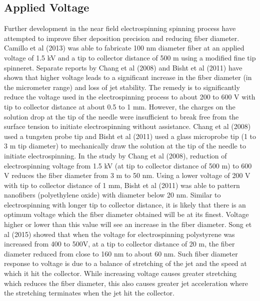 \documentclass[3p,,preprint,12pt]{elsarticle}
\begin{document}
\subsection{Applied Voltage}Further development in the near field electrospinning spinning process have attempted to improve fiber deposition precision and reducing fiber diameter. Camillo et al (2013) was able to fabricate 100 nm diameter fiber at an applied voltage of 1.5 kV and a tip to collector distance of 500 \textmu m using a modified fine tip spinneret. Separate reports by Chang et al (2008) and Bisht et al (2011) have shown that higher voltage leads to a significant increase in the fiber diameter (in the micrometer range) and loss of jet stability. The remedy is to significantly reduce the voltage used in the electrospinning process to about 200 to 600 V with tip to collector distance at about 0.5 to 1 mm. However, the charges on the solution drop at the tip of the needle were insufficient to break free from the surface tension to initiate electrospinning without assistance. Chang et al (2008) used a tungsten probe tip and Bisht et al (2011) used a glass microprobe tip (1 to 3 \textmu m tip diameter) to mechanically draw the solution at the tip of the needle to initiate electrospinning. In the study by Chang et al (2008), reduction of electrospinning voltage from 1.5 kV (at tip to collector distance of 500 \textmu m) to 600 V reduces the fiber diameter from 3 \textmu m to 50 nm. Using a lower voltage of 200 V with tip to collector distance of 1 mm, Bisht et al (2011) was able to pattern nanofibers (polyethylene oxide) with diameter below 20 nm. Similar to electrospinning with longer tip to collector distance, it is likely that there is an optimum voltage which the fiber diameter obtained will be at its finest. Voltage higher or lower than this value will see an increase in the fiber diameter. Song et al (2015) showed that when the voltage for electrospinning polystyrene was increased from 400 to 500V, at a tip to collector distance of 20 \textmu m, the fiber diameter reduced from close to 160 nm to about 60 nm. Such fiber diameter response to voltage is due to a balance of stretching of the jet and the speed at which it hit the collector. While increasing voltage causes greater stretching which reduces the fiber diameter, this also causes greater jet acceleration where the stretching terminates when the jet hit the collector.
\end{document}
